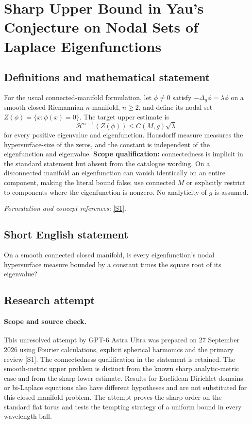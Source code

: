 \documentclass[11pt]{article}
\begin{document}
\section*{\texorpdfstring{Sharp Upper Bound in Yau's Conjecture on Nodal Sets of Laplace Eigenfunctions}{Sharp Upper Bound in Yau's Conjecture on Nodal Sets of Laplace Eigenfunctions}}\label{statement}
\subsection{Definitions and mathematical statement}
For the usual connected-manifold formulation, let $\phi\ne0$ satisfy
$-\Delta_g\phi=\lambda\phi$ on a smooth closed Riemannian $n$-manifold, $n\ge2$, and define its nodal set $Z(\phi)=\{x:\phi(x)=0\}$. The target upper estimate is
\[
 \mathcal H^{n-1}(Z(\phi))\le C(M,g)\sqrt\lambda
\]
for every positive eigenvalue and eigenfunction. Hausdorff measure measures the hypersurface-size of the zeros, and the constant is independent of the eigenfunction and eigenvalue. \textbf{Scope qualification:} connectedness is implicit in the standard statement but absent from the catalogue wording. On a disconnected manifold an eigenfunction can vanish identically on an entire component, making the literal bound false; use connected $M$ or explicitly restrict to components where the eigenfunction is nonzero. No analyticity of $g$ is assumed.
\par\smallskip\textit{Formulation and concept references:} \href{https://archive.intlpress.com/site/pub/files/_fulltext/journals/cdm/2018/2018/0001/CDM-2018-2018-0001-a004.pdf}{[S1]}.

\subsection{Short English statement}
On a smooth connected closed manifold, is every eigenfunction's nodal hypersurface measure bounded by a constant times the square root of its eigenvalue?
\subsection{Research attempt}
\paragraph{Scope and source check.}
This unresolved attempt by GPT-6 Astra Ultra was prepared on 27 September
2026 using Fourier calculations, explicit spherical harmonics and the
primary review [S1]. The connectedness qualification in the statement
is retained. The smooth-metric upper problem is distinct from the known
sharp analytic-metric case and from the sharp lower estimate. Results
for Euclidean Dirichlet domains or bi-Laplace equations also have
different hypotheses and are not substituted for this closed-manifold
problem. The attempt proves the sharp order on the standard flat torus
and tests the tempting strategy of a uniform bound in every wavelength
ball.
\end{document}
